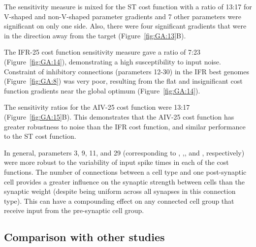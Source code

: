\smallskip{}

The sensitivity measure is mixed for the ST cost function with a ratio of
13:17 for V-shaped and non-V-shaped parameter gradients and 7 other
parameters were significant on only one side. Also, there were four
significant gradients that were in the direction away from the target
(Figure~\ref{fig:GA:13}B).

\smallskip{}

The IFR-25 cost function sensitivity measure gave a ratio of 7:23
(Figure~\ref{fig:GA:14}), demonstrating a high susceptibility to input
noise. Constraint of inhibitory connections (parameters 12-30) in the IFR
best genomes (Figure~\ref{fig:GA:8}) was very poor, resulting from the flat
and insignificant cost function gradients near the global optimum 
(Figure~\ref{fig:GA:14}).

\smallskip{}

The sensitivity ratios for the AIV-25 cost function were 13:17
(Figure~\ref{fig:GA:15}B).  This demonstrates that the AIV-25 cost function
has greater robustness to noise than the IFR cost function, and similar
performance to the ST cost function.

\smallskip{}

In general, parameters 3, 9, 11, and 29 (corresponding to \nHSRTS,
\nHSRTV,\nLSRGLG, and \nGLGDS, respectively) were more robust to the
variability of input spike times in each of the cost functions.  The number
of connections between a cell type and one post-synaptic cell provides a
greater influence on the synaptic strength between cells than the synaptic
weight (despite being uniform across all synapses in this connection
type). This can have a compounding effect on any connected cell group that
receive input from the pre-synaptic cell group.


\subsection{Comparison with other studies}\label{sec:GA:comp-with-other}



\smallskip{}


